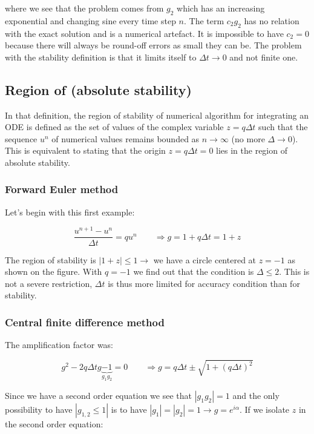 where we see that the problem comes from $g_2$ which has an increasing exponential and changing sine every time step $n$. The term $c_2g_2$ has no relation with the exact solution and is a numerical artefact. It is impossible to have $c_2 = 0$ because there will always be round-off errors as small they can be. The problem with the stability definition is that it limits itself to $\Delta t \rightarrow 0$ and not finite one. 

\subsection{Region of (absolute stability)}
In that definition, the region of stability of numerical algorithm for integrating an ODE is defined as the set of values of the complex variable $z=q\Delta t$ such that the sequence $u^n$ of numerical values remains bounded as $n\rightarrow \infty$ (no more $\Delta \rightarrow 0$). This is equivalent to stating that the origin $z = q \Delta t = 0$ lies in the region of absolute stability. 

\subsubsection{Forward Euler method}
Let's begin with this first example: 

\begin{equation}
\frac{u^{n+1}-u^n}{\Delta t} = qu^n \qquad \Rightarrow g = 1+q\Delta t = 1+z
\end{equation}

The region of stability is $|1+z|\leq 1 \rightarrow$ we have a circle centered at $z=-1$ as shown on the figure. With $q=-1$ we find out that the condition is $\Delta \leq 2$. This is not a severe restriction, $\Delta t$ is thus more limited for accuracy condition than for stability. 

\subsubsection{Central finite difference method}
The amplification factor was: 

\begin{equation}
g^2 - 2q\Delta t g \underbrace{- 1}_{g_1g_2} = 0\qquad \Rightarrow g = q\Delta t \pm \sqrt{1+(q\Delta t)^2}
\end{equation}

Since we have a second order equation we see that $|g_1g_2| = 1$ and the only possibility to have $|g_{1,2}\leq 1|$ is to have $|g_1| = |g_2| = 1 \rightarrow g= e^{i\alpha}$. If we isolate $z$ in the second order equation: 

